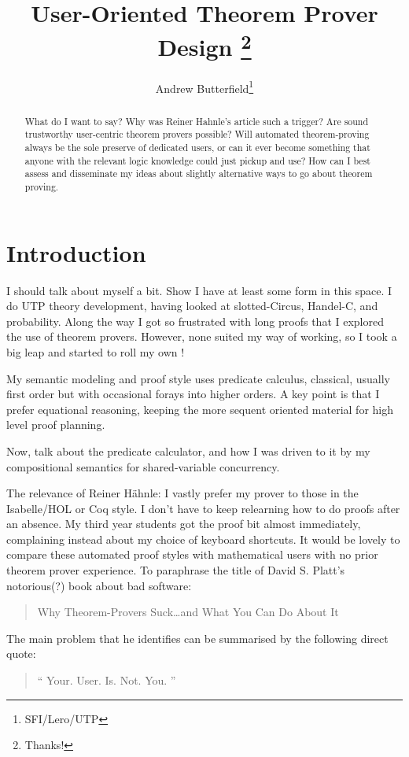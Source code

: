 \documentclass[EPiC]{easychair}
\title{User-Oriented Theorem Prover Design%
\thanks{Thanks!}}
\author{
Andrew Butterfield\inst{1}\thanks{SFI/Lero/UTP}
}
\institute{
  Trinity College Dublin,
  Ireland\\
  \email{butrfeld@scss.tcd.ie}
 }
\begin{document}
\maketitle

\begin{abstract}
  What do I want to say?
  Why was Reiner Hahnle's article \cite{RH:UserExpr:2016}such a trigger?
  Are sound trustworthy user-centric theorem provers possible?
  Will automated theorem-proving always be the sole preserve of dedicated users,
  or can it ever become something that anyone with the relevant logic knowledge could just pickup and use?
  How can I best assess and disseminate my ideas about slightly alternative ways
  to go about theorem proving.
\end{abstract}



\section{Introduction}
\label{sect:introduction}

I should talk about myself a bit.
Show I have at least some form in this space.
I do UTP theory development,
having looked at slotted-Circus, Handel-C, and probability.
Along the way I got so frustrated with long proofs that
I explored the use of theorem provers.
However, none suited my way of working,
so I took a big leap and started to roll my own
\cite{conf/utp/Butterfield10,conf/utp/Butterfield12,DBLP:journals/corr/Butterfield14}!


My semantic modeling and proof style uses predicate calculus,
classical, usually first order
but with occasional forays into higher orders.
A key point is that I prefer equational reasoning,
keeping the more sequent oriented material for high level proof planning.

Now, talk about the predicate calculator\cite{DBLP:conf/utp/Butterfield16},
and how I was driven to it by
my compositional semantics for shared-variable concurrency.

The relevance of Reiner H\"{a}hnle\cite{RH:UserExpr:2016}:
I vastly prefer my prover to those in the Isabelle/HOL or Coq style.
I don't have to keep relearning how to do proofs after an absence.
My third year students got the proof bit almost immediately,
complaining instead about my choice of keyboard shortcuts.
It would be lovely to compare these automated proof styles
with mathematical users with no prior theorem prover experience.
To paraphrase the title of David S. Platt's notorious(?) book
about bad software\cite{Platt:2006}:
\begin{quote}
  Why Theorem-Provers Suck\dots and What You Can Do About It
\end{quote}
The main problem that he identifies can be summarised by the following
direct quote:
\begin{quote}
  ``
   Your.
   User.
   Is.
   Not.
   You.
  ''\cite{Platt:2006}
\end{quote}
\end{document}
